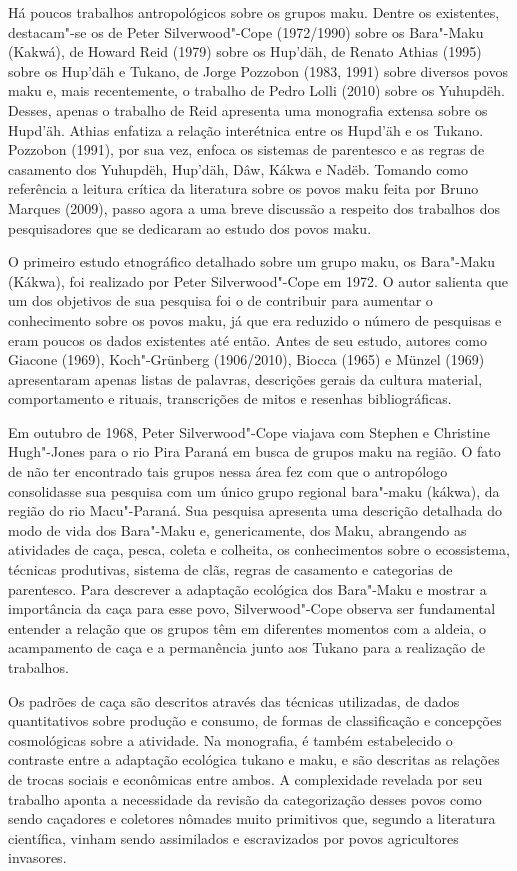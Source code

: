 Há poucos trabalhos antropológicos sobre os grupos maku. Dentre os
existentes, destacam"-se os de Peter Silverwood"-Cope (1972/1990) sobre os
Bara"-Maku (Kakwá), de Howard Reid (1979) sobre os Hup'däh, de Renato
Athias (1995) sobre os Hup'däh e Tukano, de Jorge Pozzobon (1983, 1991)
sobre diversos povos maku e, mais recentemente, o trabalho de Pedro
Lolli (2010) sobre os Yuhupdëh. Desses, apenas o trabalho de Reid
apresenta uma monografia extensa sobre os Hupd'äh. Athias enfatiza a
relação interétnica entre os Hupd'äh e os Tukano. Pozzobon (1991), por
sua vez, enfoca os sistemas de parentesco e as regras de casamento dos
Yuhupdëh, Hup'däh, Dâw, Kákwa e Nadëb. Tomando como referência a leitura
crítica da literatura sobre os povos maku feita por Bruno Marques
(2009), passo agora a uma breve discussão a respeito dos trabalhos dos
pesquisadores que se dedicaram ao estudo dos povos maku.

O primeiro estudo etnográfico detalhado sobre um grupo maku, os
Bara"-Maku (Kákwa), foi realizado por Peter Silverwood"-Cope em 1972. O
autor salienta que um dos objetivos de sua pesquisa foi o de contribuir
para aumentar o conhecimento sobre os povos maku, já que era reduzido o
número de pesquisas e eram poucos os dados existentes até então. Antes
de seu estudo, autores como Giacone (1969), Koch"-Grünberg (1906/2010),
Biocca (1965) e Münzel (1969) apresentaram apenas listas de palavras,
descrições gerais da cultura material, comportamento e rituais,
transcrições de mitos e resenhas bibliográficas.

Em outubro de 1968, Peter Silverwood"-Cope viajava com Stephen e
Christine Hugh"-Jones para o rio Pira Paraná em busca de grupos maku na
região. O fato de não ter encontrado tais grupos nessa área fez com que
o antropólogo consolidasse sua pesquisa com um único grupo regional
bara"-maku (kákwa), da região do rio Macu"-Paraná. Sua pesquisa apresenta
uma descrição detalhada do modo de vida dos Bara"-Maku e, genericamente,
dos Maku, abrangendo as atividades de caça, pesca, coleta e colheita, os
conhecimentos sobre o ecossistema, técnicas produtivas, sistema de clãs,
regras de casamento e categorias de parentesco. Para descrever a
adaptação ecológica dos Bara"-Maku e mostrar a importância da caça para
esse povo, Silverwood"-Cope observa ser fundamental entender a relação
que os grupos têm em diferentes momentos com a aldeia, o acampamento de
caça e a permanência junto aos Tukano para a realização de trabalhos.

Os padrões de caça são descritos através das técnicas utilizadas, de
dados quantitativos sobre produção e consumo, de formas de classificação
e concepções cosmológicas sobre a atividade. Na monografia, é também
estabelecido o contraste entre a adaptação ecológica tukano e maku, e
são descritas as relações de trocas sociais e econômicas entre ambos. A
complexidade revelada por seu trabalho aponta a necessidade da revisão
da categorização desses povos como sendo caçadores e coletores nômades
muito primitivos que, segundo a literatura científica, vinham sendo
assimilados e escravizados por povos agricultores invasores.

